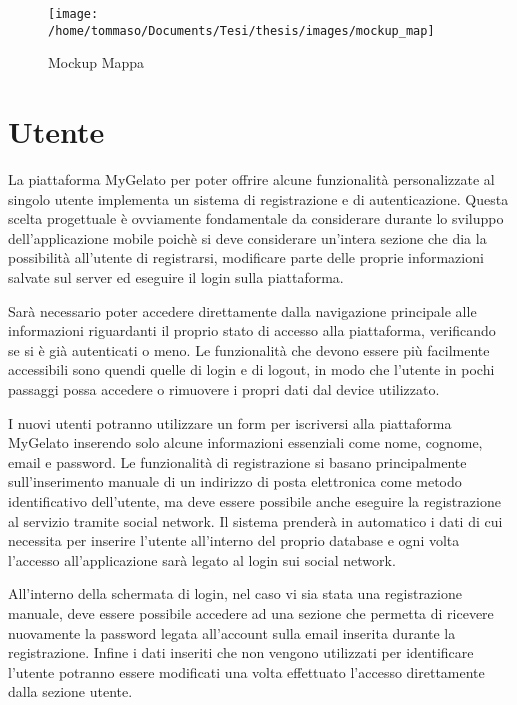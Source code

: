 \begin{figure}[H]
\texttt{[image: /home/tommaso/Documents/Tesi/thesis/images/mockup\_map]}

\caption{\label{fig:Mockup-Mappa}Mockup Mappa}

\end{figure}


\section{Utente}

La piattaforma MyGelato per poter offrire alcune funzionalità personalizzate
al singolo utente implementa un sistema di registrazione e di autenticazione.
Questa scelta progettuale è ovviamente fondamentale da considerare
durante lo sviluppo dell'applicazione mobile poichè si deve considerare
un'intera sezione che dia la possibilità all'utente di registrarsi,
modificare parte delle proprie informazioni salvate sul server ed
eseguire il login sulla piattaforma.

Sarà necessario poter accedere direttamente dalla navigazione principale
alle informazioni riguardanti il proprio stato di accesso alla piattaforma,
verificando se si è già autenticati o meno. Le funzionalità che devono
essere più facilmente accessibili sono quendi quelle di login e di
logout, in modo che l'utente in pochi passaggi possa accedere o rimuovere
i propri dati dal device utilizzato.\bigskip{}

I nuovi utenti potranno utilizzare un form per iscriversi alla piattaforma
MyGelato inserendo solo alcune informazioni essenziali come nome,
cognome, email e password. Le funzionalità di registrazione si basano
principalmente sull'inserimento manuale di un indirizzo di posta elettronica
come metodo identificativo dell'utente, ma deve essere possibile anche
eseguire la registrazione al servizio tramite social network. Il sistema
prenderà in automatico i dati di cui necessita per inserire l'utente
all'interno del proprio database e ogni volta l'accesso all'applicazione
sarà legato al login sui social network.\bigskip{}

All'interno della schermata di login, nel caso vi sia stata una registrazione
manuale, deve essere possibile accedere ad una sezione che permetta
di ricevere nuovamente la password legata all'account sulla email
inserita durante la registrazione. Infine i dati inseriti che non
vengono utilizzati per identificare l'utente potranno essere modificati
una volta effettuato l'accesso direttamente dalla sezione utente.

